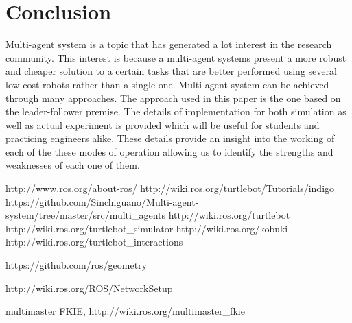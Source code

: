 \documentclass[journal]{IEEEtran}
\begin{document}
\begin{enumerate}
\begin{enumerate}
\end{enumerate}











\end{enumerate}
\section{Conclusion}


Multi-agent system is a topic that has generated a lot interest in the research community. This interest is because a multi-agent systems present a more robust and cheaper solution to a certain tasks that are better performed using several low-cost robots rather than a single one. Multi-agent system can be achieved through many approaches. The approach used in this paper is the one based on the leader-follower premise.
The details of implementation for both simulation as well
as actual experiment is provided which will be useful for
students and practicing engineers alike. These details provide
an insight into the working of each of the these modes of
operation allowing us to identify the strengths and weaknesses
of each one of them.



















\begin{thebibliography}{1}

http://www.ros.org/about-ros/
http://wiki.ros.org/turtlebot/Tutorials/indigo
https://github.com/Sinchiguano/Multi-agent-system/tree/master/src/multi{\_}agents
http://wiki.ros.org/turtlebot
http://wiki.ros.org/turtlebot{\_}simulator
http://wiki.ros.org/kobuki
http://wiki.ros.org/turtlebot{\_}interactions

https://github.com/ros/geometry

http://wiki.ros.org/ROS/NetworkSetup


multimaster FKIE, http://wiki.ros.org/multimaster{\_}fkie
\end{thebibliography}
\end{document}
